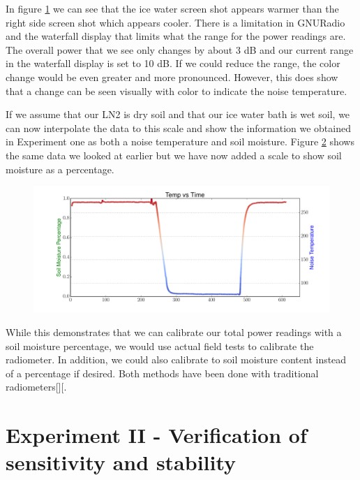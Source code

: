 {\begin{figure}[h!tb]
\label{side_waterfall}
\end{figure}

In figure \ref{side_waterfall} we can see that the ice water screen shot appears warmer than the right side screen shot which appears cooler.  There is a limitation in GNURadio and the waterfall display that limits what the range for the power readings are.  The overall power that we see only changes by about 3 dB and our current range in the waterfall display is set to 10 dB.  If we could reduce the range, the color change would be even greater and more pronounced.  However, this does show that a change can be seen visually with color to indicate the noise temperature.  

If we assume that our LN2 is dry soil and that our ice water bath is wet soil, we can now interpolate the data to this scale and show the information we obtained in Experiment one as both a noise temperature and soil moisture.  Figure \ref{SDR_soil} shows the same data we looked at earlier but we have now added a scale to show soil moisture as a percentage.

\begin{figure}[h!tb] \centering

\includegraphics[width=\textwidth]{Experiments/Exp1/sdr_soilmoisture.pdf}
\label{SDR_soil}
\end{figure}

While this demonstrates that we can calibrate our total power readings with a soil moisture percentage, we would use actual field tests to calibrate the radiometer.  In addition, we could also calibrate to soil moisture content instead of a percentage if desired.  Both methods have been done with traditional radiometers[\cite{Jonard}][\cite{Shi}.

\section{Experiment II - Verification of sensitivity and stability} \label{Exp2_results}

}
